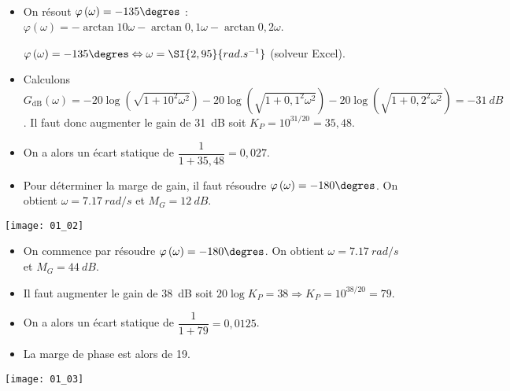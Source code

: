 \ifprof
\begin{corrige} ~\\

\begin{itemize}
\item On résout $\varphi\left(\omega\right)=-135\degres$ : 
$\varphi\left(\omega\right)=-\arctan 10\omega-\arctan 0,1\omega-\arctan 0,2\omega$.

$\varphi\left(\omega\right)=-135\degres \Leftrightarrow \omega = \SI{2,95}{rad.s^{-1}}$ (solveur Excel). 

\item Calculons $G_{\text{dB}}(\omega)=-20\log\left(\sqrt{1+10^2\omega^2} \right)-20\log\left(\sqrt{1+0,1^2\omega^2} \right)-20\log\left(\sqrt{1+0,2^2\omega^2} \right)=\SI{-31}{dB}$. Il faut donc augmenter le gain de \SI{31}{dB} soit $K_P=10^{31/20}=35,48$.


\item On a alors un écart statique de $\dfrac{1}{1+35,48}=0,027$.

\item Pour déterminer la marge de gain, il faut résoudre $\varphi\left(\omega\right)=-180\degres$. On obtient $\omega=\SI{7,17}{rad/s}$ et $M_G=\SI{12}{dB}$.
\end{itemize}


\begin{center}
\texttt{[image: 01\_02]}
\end{center}

\end{corrige}
\else
\fi


\ifprof
\begin{corrige}
\begin{itemize}
\item On commence par résoudre $\varphi\left(\omega\right)=-180\degres$. On obtient $\omega=\SI{7,17}{rad/s}$ et $M_G=\SI{44}{dB}$.

\item Il faut augmenter le gain de \SI{38}{dB} soit $20\log K_P=38\Rightarrow K_P=10^{38/20}=79$.


\item On a alors un écart statique de $\dfrac{1}{1+79}=0,0125$.

\item La marge de phase est alors de 19\degres. 
\end{itemize}

\begin{center}
\texttt{[image: 01\_03]}
\end{center}

\end{corrige}
\else
\fi



